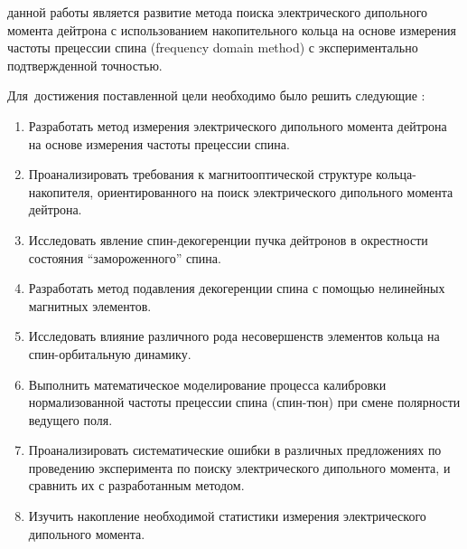 

{\aim} данной работы является развитие метода поиска электрического дипольного момента дейтрона с использованием накопительного кольца на основе измерения частоты прецессии спина (frequency domain method) с экспериментально подтвержденной точностью.

Для~достижения поставленной цели необходимо было решить следующие {\tasks}:
\begin{enumerate}
	\item Разработать метод измерения электрического дипольного момента дейтрона на основе измерения частоты прецессии спина.
	\item Проанализировать требования к магнитооптической структуре кольца-накопителя, ориентированного на поиск электрического дипольного момента дейтрона.
	\item Исследовать явление спин-декогеренции пучка дейтронов в окрестности состояния ``замороженного'' спина. 
	\item Разработать метод подавления декогеренции спина с помощью нелинейных магнитных элементов.
	\item Исследовать влияние различного рода несовершенств элементов кольца на спин-орбитальную динамику. 
	\item Выполнить математическое моделирование процесса калибровки нормализованной частоты прецессии спина (спин-тюн) при смене полярности ведущего поля.
	\item Проанализировать систематические ошибки в различных предложениях по проведению эксперимента по поиску электрического дипольного момента, и сравнить их с разработанным методом. 
	\item Изучить накопление необходимой статистики измерения электрического дипольного момента.
\end{enumerate}

